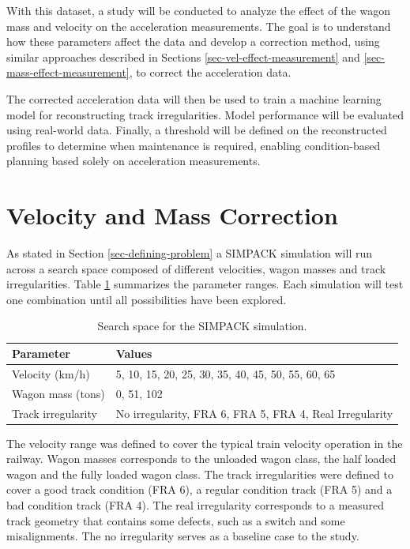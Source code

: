 With this dataset, a study will be conducted to analyze the effect of the wagon mass and velocity on the acceleration measurements. The goal is to understand how these parameters affect the data and develop a correction method, using similar approaches described in Sections \ref{sec-vel-effect-measurement} and \ref{sec-mass-effect-measurement}, to correct the acceleration data.

The corrected acceleration data will then be used to train a machine learning model for reconstructing track irregularities. Model performance will be evaluated using real-world data. Finally, a threshold will be defined on the reconstructed profiles to determine when maintenance is required, enabling condition-based planning based solely on acceleration measurements.

\section{Velocity and Mass Correction} \label{sec-vel-mass-correction}

As stated in Section \ref{sec-defining-problem} a SIMPACK simulation will run across a search space composed of different velocities, wagon masses and track irregularities. Table \ref{table:search_space} summarizes the parameter ranges. Each simulation will test one combination until all possibilities have been explored.

\begin{table}[H]
\centering
\begin{tabular}{l l}
\hline
\textbf{Parameter} & \textbf{Values} \\
\hline
Velocity (km/h) & 5, 10, 15, 20, 25, 30, 35, 40, 45, 50, 55, 60, 65 \\
Wagon mass (tons) & 0, 51, 102 \\
Track irregularity & No irregularity, FRA 6, FRA 5, FRA 4, Real Irregularity \\
\hline
\end{tabular}
\caption{Search space for the SIMPACK simulation.}
\label{table:search_space}
\end{table}

The velocity range was defined to cover the typical train velocity operation in the railway. Wagon masses corresponds to the unloaded wagon class, the half loaded wagon and the fully loaded wagon class. The track irregularities were defined to cover a good track condition (FRA 6), a regular condition track (FRA 5) and a bad condition track (FRA 4). The real irregularity corresponds to a measured track geometry that contains some defects, such as a switch and some misalignments. The no irregularity serves as a baseline case to the study.

